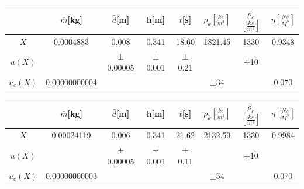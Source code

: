 \documentclass{article}
\begin{document}
\begin{tabular}{|c|c|c|c|c|c|c|c|}
    \hline
    &$\bar{m}$[kg]&$\bar{d}$[m]&h[m]&$\bar{t}$[s]&$\rho_{k}\left[\frac{ks}{m^{3}}\right]$&$\rho_{c}$$\left[\frac{ks}{m^{3}}\right]$&$\eta\left[\frac{Ns}{M^{2}}\right]$\\
    \hline 
    $X$ &0.0004883&0.008&0.341&18.60&1821.45&1330&0.9348\\\hline
    $u(X)$&\cellcolor{gray}&$\pm$0.00005&$\pm$0.001&$\pm$0.21&\cellcolor{gray}&$\pm$10&\cellcolor{gray}    \\\hline
    $u_{c}(X)$&0.00000000004&\cellcolor{gray}&\cellcolor{gray}&\cellcolor{gray}&$\pm$34&\cellcolor{gray}&0.070\\\hline
\end{tabular}

\begin{tabular}{|c|c|c|c|c|c|c|c|}
    \hline
    \cellcolor{gray!50}&\cellcolor{gray!50}$\bar{m}$[kg]&\cellcolor{gray!50}$\bar{d}$[m]&\cellcolor{gray!50}h[m]&\cellcolor{gray!50}$\bar{t}$[s]&\cellcolor{gray!50}$\rho_{k}\left[\frac{ks}{m^{3}}\right]$&\cellcolor{gray!50}$\rho_{c}$$\left[\frac{ks}{m^{3}}\right]$&\cellcolor{gray!50}$\eta\left[\frac{Ns}{M^{2}}\right]$\\
    \hline 
    \cellcolor{gray!50}$X$ &\cellcolor{gray!50}0.00024119&\cellcolor{gray!50}0.006&\cellcolor{gray!50}0.341&\cellcolor{gray!50}21.62&\cellcolor{gray!50}2132.59&\cellcolor{gray!50}1330&\cellcolor{gray!50}0.9984\\\hline
    \cellcolor{gray!50}$u(X)$&\cellcolor{gray}&\cellcolor{gray!50}$\pm$0.00005&\cellcolor{gray!50}$\pm$0.001&\cellcolor{gray!50}$\pm$0.11&\cellcolor{gray}&\cellcolor{gray!50}$\pm$10&\cellcolor{gray}    \\\hline
    \cellcolor{gray!50}$u_{c}(X)$&\cellcolor{gray!50}0.00000000003&\cellcolor{gray}&\cellcolor{gray}&\cellcolor{gray}&\cellcolor{gray!50}$\pm$54&\cellcolor{gray}&\cellcolor{gray!50}0.070\\\hline
\end{tabular}
\end{document}
